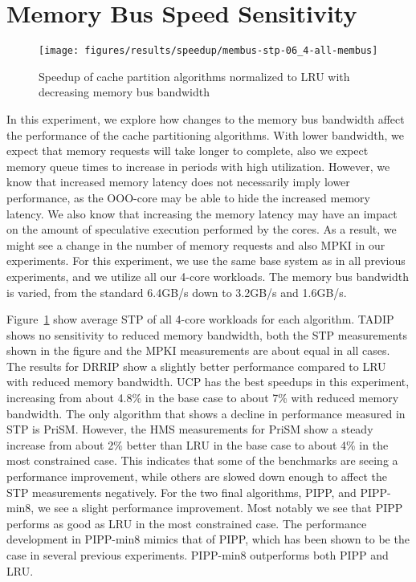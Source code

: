 \section{Memory Bus Speed Sensitivity}
\label{sec:results:bus_sensitivity}


\begin{figure}[t]
    \centering
    \texttt{[image: figures/results/speedup/membus-stp-06\_4-all-membus]}
    \caption{Speedup of cache partition algorithms normalized to LRU with decreasing memory bus bandwidth}
    \label{fig:results:bus}
\end{figure}

In this experiment, we explore how changes to the memory bus bandwidth affect the performance of the cache partitioning algorithms.
With lower bandwidth, we expect that memory requests will take longer to complete, also we expect memory queue times to increase in periods with high utilization.
However, we know that increased memory latency does not necessarily imply lower performance, as the OOO-core may be able to hide the increased memory latency.
We also know that increasing the memory latency may have an impact on the amount of speculative execution performed by the cores.
As a result, we might see a change in the number of memory requests and also MPKI in our experiments.
For this experiment, we use the same base system as in all previous experiments, and we utilize all our 4-core workloads.
The memory bus bandwidth is varied, from the standard 6.4GB/s down to 3.2GB/s and 1.6GB/s.

Figure~\ref{fig:results:bus} show average STP of all 4-core workloads for each algorithm.
TADIP shows no sensitivity to reduced memory bandwidth, both the STP measurements shown in the figure and the MPKI measurements are about equal in all cases.
The results for DRRIP show a slightly better performance compared to LRU with reduced memory bandwidth.
UCP has the best speedups in this experiment, increasing from about 4.8\% in the base case to about 7\% with reduced memory bandwidth.
The only algorithm that shows a decline in performance measured in STP is PriSM.
However, the HMS measurements for PriSM show a steady increase from about 2\% better than LRU in the base case to about 4\% in the most constrained case.
This indicates that some of the benchmarks are seeing a performance improvement, while others are slowed down enough to affect the STP measurements negatively.
For the two final algorithms, PIPP, and PIPP-min8, we see a slight performance improvement.
Most notably we see that PIPP performs as good as LRU in the most constrained case.
The performance development in PIPP-min8 mimics that of PIPP, which has been shown to be the case in several previous experiments.
PIPP-min8 outperforms both PIPP and LRU.


